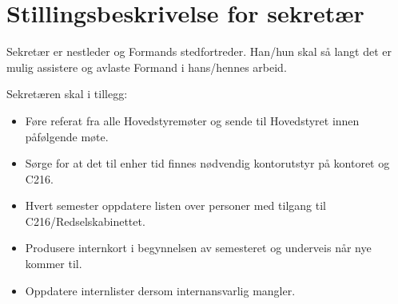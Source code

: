 \section{Stillingsbeskrivelse for sekretær}

Sekretær er nestleder og Formands stedfortreder.
Han/hun skal så langt det er mulig assistere og
avlaste Formand i hans/hennes arbeid.

Sekretæren skal i tillegg:
\begin{itemize}
\item Føre referat fra alle Hovedstyremøter og
      sende til Hovedstyret innen påfølgende møte.
\item Sørge for at det til enher tid finnes nødvendig
      kontorutstyr på kontoret og C216.
\end{itemize}

\begin{itemize}
\item Hvert semester oppdatere listen over personer med
      tilgang til C216/Redselskabinettet.
\item Produsere internkort i begynnelsen av semesteret og
      underveis når nye kommer til.
\item Oppdatere internlister dersom internansvarlig mangler.
\end{itemize}
